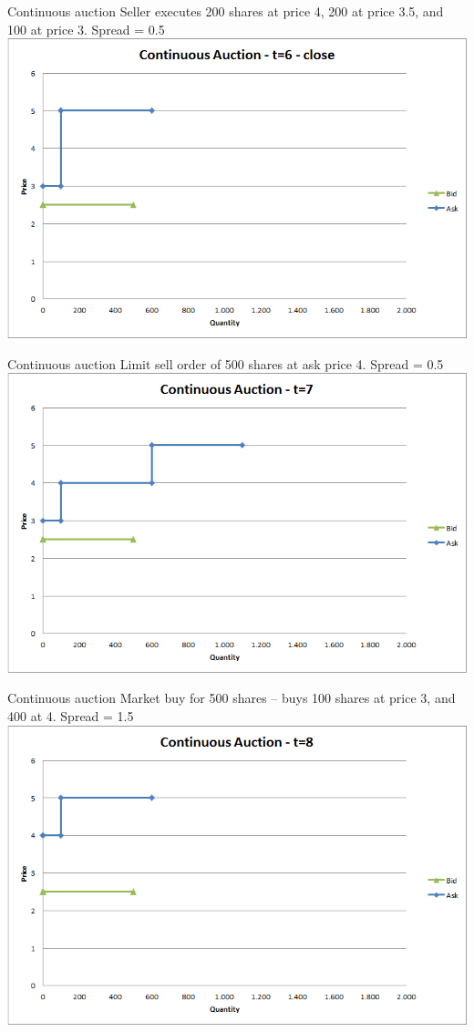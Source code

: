 \documentclass[english,10pt
,aspectratio=169
]{beamer}
\begin{document}
\begin{frame}{Continuous auction}
	Seller executes 200 shares at price 4, 200 at price 3.5, and 100 at price 3. Spread = 0.5
	\center
	\includegraphics[width=.75\linewidth]{pics/ch1/Continuous_t6close}
\end{frame}


\begin{frame}{Continuous auction}
	Limit sell order of 500 shares at ask price 4. Spread = 0.5
	\center
	\includegraphics[width=.75\linewidth]{pics/ch1/Continuous_t7}
\end{frame}


\begin{frame}{Continuous auction}
	Market buy for 500 shares -- buys 100 shares at price 3, and 400 at 4. Spread = 1.5
	\center
	\includegraphics[width=.75\linewidth]{pics/ch1/Continuous_t8}
\end{frame}
\end{document}
